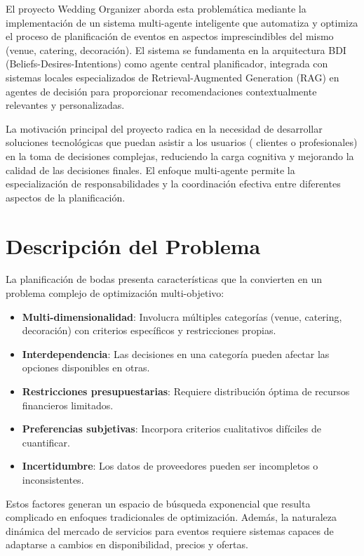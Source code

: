 \documentclass[runningheads,a4paper]{llncs}
\begin{document}
El proyecto Wedding Organizer aborda esta problemática mediante la implementación de un sistema multi-agente inteligente que automatiza y optimiza el proceso de planificación de eventos en aspectos imprescindibles del mismo (venue, catering, decoración). El sistema se fundamenta en la arquitectura BDI (Beliefs-Desires-Intentions) \cite{rao1995bdi} como agente central planificador, integrada con sistemas locales especializados de Retrieval-Augmented Generation (RAG) \cite{lewis2020retrieval} en agentes de decisión para proporcionar recomendaciones contextualmente relevantes y personalizadas.

La motivación principal del proyecto radica en la necesidad de desarrollar soluciones tecnológicas que puedan asistir a los usuarios ( clientes o profesionales) en la toma de decisiones complejas, reduciendo la carga cognitiva y mejorando la calidad de las decisiones finales. El enfoque multi-agente permite la especialización de responsabilidades y la coordinación efectiva entre diferentes aspectos de la planificación.

\section{Descripción del Problema}

La planificación de bodas presenta características que la convierten en un problema complejo de optimización multi-objetivo:

\begin{itemize}
    \item \textbf{Multi-dimensionalidad}: Involucra múltiples categorías (venue, catering, decoración) con criterios específicos y restricciones propias.
    \item \textbf{Interdependencia}: Las decisiones en una categoría pueden afectar las opciones disponibles en otras.
    \item \textbf{Restricciones presupuestarias}: Requiere distribución óptima de recursos financieros limitados.
    \item \textbf{Preferencias subjetivas}: Incorpora criterios cualitativos difíciles de cuantificar.
    \item \textbf{Incertidumbre}: Los datos de proveedores pueden ser incompletos o inconsistentes.
\end{itemize}

Estos factores generan un espacio de búsqueda exponencial que resulta complicado en enfoques tradicionales de optimización. Además, la naturaleza dinámica del mercado de servicios para eventos requiere sistemas capaces de adaptarse a cambios en disponibilidad, precios y ofertas.
\end{document}
